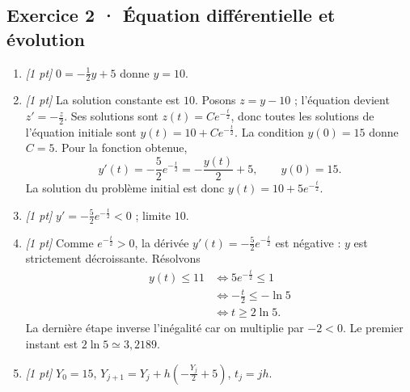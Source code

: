 \subsection*{Exercice 2 · Équation différentielle et évolution}\begin{enumerate}

\item \textit{[1 pt]} $0=-\frac{1}{2}y+5$ donne $y=10$.

\item \textit{[1 pt]} La solution constante est $10$. Posons $z=y-10$ ; l'équation devient $z'=-\frac{z}{2}$. Ses solutions sont $z(t)=Ce^{-\frac{t}{2}}$, donc toutes les solutions de l'équation initiale sont $y(t)=10+Ce^{-\frac{t}{2}}$.
La condition $y(0)=15$ donne $C=5$. Pour la fonction obtenue,
\[y'(t)=-\frac{5}{2}e^{-\frac{t}{2}}=-\frac{y(t)}{2}+5,\qquad y(0)=15.\]
La solution du problème initial est donc $y(t)=10+5e^{-\frac{t}{2}}$.

\item \textit{[1 pt]} $y'=-\frac{5}{2}e^{-\frac{t}{2}}<0$ ; limite $10$.

\item \textit{[1 pt]} Comme $e^{-\frac{t}{2}}>0$, la dérivée $y'(t)=-\frac{5}{2}e^{-\frac{t}{2}}$ est négative : $y$ est strictement décroissante. Résolvons
\[\begin{aligned}y(t)\le 11&\Longleftrightarrow 5e^{-\frac{t}{2}}\le1\\&\Longleftrightarrow -\frac{t}{2}\le-\ln 5\\&\Longleftrightarrow t\ge 2\ln 5.\end{aligned}\]
La dernière étape inverse l'inégalité car on multiplie par $-2<0$. Le premier instant est $2\ln 5\simeq3{,}2189$.

\item \textit{[1 pt]} $Y_0=15$, $Y_{j+1}=Y_j+h(-\frac{Y_j}{2}+5)$, $t_j=jh$.

\end{enumerate}


